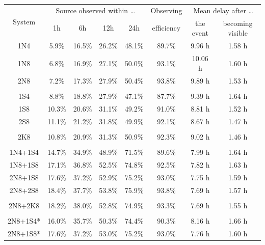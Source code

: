 \begin{colsection}
\begin{table}[p]
    \begin{center}
        \begin{tabular}{c|cccc|c|cc} %
            \multirow{2}{*}{System} &
            \multicolumn{4}{c|}{Source observed within \ldots} &
            {\small Observing} &
            \multicolumn{2}{c}{Mean delay after \ldots} \\
                & 1h & 6h & 12h & 24h & efficiency & {\small the event} & {\small becoming visible} \\
            \midrule
                 1N4 &  5.9\% & 16.5\% & 26.2\% & 48.1\% & 89.7\% &  9.96 h & 1.58 h \\
                 1N8 &  6.8\% & 16.9\% & 27.1\% & 50.0\% & 93.1\% & 10.06 h & 1.60 h \\
                 2N8 &  7.2\% & 17.3\% & 27.9\% & 50.4\% & 93.8\% &  9.89 h & 1.53 h \\
            &&&&&&&\\
                 1S4 &  8.8\% & 18.8\% & 27.9\% & 47.1\% & 87.7\% &  9.39 h & 1.64 h \\
                 1S8 & 10.3\% & 20.6\% & 31.1\% & 49.2\% & 91.0\% &  8.81 h & 1.52 h \\
                 2S8 & 11.1\% & 21.2\% & 31.8\% & 49.9\% & 92.1\% &  8.67 h & 1.47 h \\
            &&&&&&&\\
                 2K8 & 10.8\% & 20.9\% & 31.3\% & 50.9\% & 92.3\% &  9.02 h & 1.46 h \\
            &&&&&&&\\
             1N4+1S4 & 14.7\% & 34.9\% & 48.9\% & 71.5\% & 89.6\% &  7.99 h & 1.64 h \\
             1N8+1S8 & 17.1\% & 36.8\% & 52.5\% & 74.8\% & 92.5\% &  7.82 h & 1.63 h \\
             2N8+1S8 & 17.6\% & 37.2\% & 52.9\% & 75.2\% & 93.0\% &  7.75 h & 1.59 h \\
             2N8+2S8 & 18.4\% & 37.7\% & 53.8\% & 75.9\% & 93.8\% &  7.69 h & 1.57 h \\
            &&&&&&&\\
            2N8+2K8  & 18.2\% & 38.0\% & 52.8\% & 74.9\% & 93.3\% &  7.69 h & 1.55 h \\
            &&&&&&&\\
            2N8+1S4* & 16.0\% & 35.7\% & 50.3\% & 74.4\% & 90.3\% &  8.16 h & 1.66 h \\
            2N8+1S8* & 17.6\% & 37.2\% & 53.0\% & 75.2\% & 93.0\% &  7.76 h & 1.60 h \\

\end{tabular}
\end{center}
\end{table}
\end{colsection}
